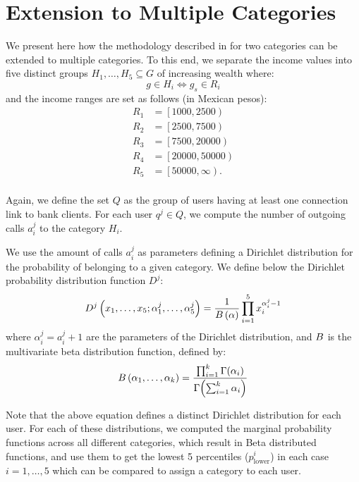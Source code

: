 \section{Extension to Multiple Categories}

We present here how the methodology described in  for
two categories can be extended to multiple categories.
To this end, we separate the income values into five distinct groups $ H_1, \ldots, H_5 \subseteq G$ of increasing wealth where:
\[
	g \in H_i \iff g_s \in R_i
\]
and the income ranges are set as follows (in Mexican pesos):
\begin{align*}
	R_1 &= \left[1000, 2500\right) \\
	R_2 &= \left[2500, 7500\right) \\
	R_3 &= \left[7500, 20000\right) \\
	R_4 &= \left[20000, 50000\right) \\
	R_5 &= \left[50000, \infty\right). \\
\end{align*}

Again, we define the set $Q$ as the group of users having at least one connection link to bank clients. For each user $q^j \in Q$, we compute the number of outgoing calls $a^j_i$ to the category $H_i$.

We use the amount of calls $a^j_i$  as parameters defining a Dirichlet distribution for the probability of belonging to a given category.
We define below the Dirichlet probability distribution function $D^j$:
\begin{equation}
D^j \left( x_1, \ldots, x_5; \alpha^j_1, \ldots, \alpha^j_5 \right) = \frac{1}{B \left( \alpha \right)} \prod^5_{i = 1} x_i^{\alpha^j_i - 1}
\label{Dirichlet}
\end{equation}
where $\alpha^j_i = a^j_i +1$ are the parameters of the Dirichlet distribution, and $B$ is the multivariate beta distribution function, defined by: %
\begin{equation}
B \left( \alpha_1, \ldots, \alpha_k \right) = \frac{\prod^k_{i = 1} \Gamma \! \left( \alpha_i \right)}{\Gamma \! \left( \sum^k_{i = 1} \alpha_i \right) }
\label{Beta}
\end{equation}

Note that the above equation defines a distinct Dirichlet distribution for each user. For each of these distributions, we computed the marginal probability functions across all different categories, which result in Beta distributed functions, and use them to get the lowest 5 percentiles (\(p^i_{\operatorname{lower}}\)) in each case ${i=1, \ldots, 5}$ which can be compared to assign a category to each user.

